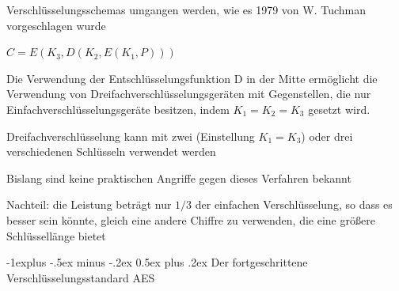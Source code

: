 \documentclass[a4paper]{article}
\makeatletter
\renewcommand{\subsection}{\@startsection{subsection}{2}{0mm}%
 {-1explus -.5ex minus -.2ex}%
 {0.5ex plus .2ex}%
 {\normalfont\normalsize\bfseries}}
\makeatother
\begin{document}
\begin{multicols}{3}
\begin{itemize*}
            Verschlüsselungsschemas umgangen werden, wie es 1979 von W. Tuchman
            vorgeschlagen wurde
            \begin{itemize*}
                  \item $C=E(K_3,D(K_2,E(K_1,P)))$
                  \item Die Verwendung der Entschlüsselungsfunktion D in der Mitte ermöglicht die Verwendung von Dreifachverschlüsselungsgeräten mit Gegenstellen, die nur Einfachverschlüsselungsgeräte besitzen, indem $K_1=K_2=K_3$ gesetzt wird.
                  \item Dreifachverschlüsselung kann mit zwei (Einstellung $K_1=K_3$) oder drei verschiedenen Schlüsseln verwendet werden
                  \item Bislang sind keine praktischen Angriffe gegen dieses Verfahren bekannt
                  \item Nachteil: die Leistung beträgt nur $1/3$ der einfachen Verschlüsselung, so dass es besser sein könnte, gleich eine andere Chiffre zu verwenden, die eine größere Schlüssellänge bietet
            \end{itemize*}
      \end{itemize*}


      \subsection{Der fortgeschrittene Verschlüsselungsstandard
            AES}


\end{multicols}
\end{document}
